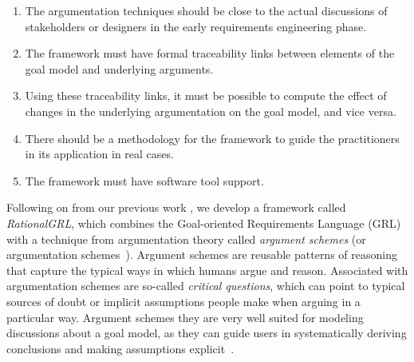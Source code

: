 \begin{enumerate}
\item 
The argumentation techniques should be close to the actual discussions of stakeholders or designers in the early requirements engineering phase.
\item 
The framework must have formal traceability links between elements of the goal model and underlying arguments.
\item 
Using these traceability links, it must be possible to compute the effect of changes in the underlying argumentation on the goal model, and vice versa.
\item 
There should be a methodology for the framework to guide the practitioners in its application in real cases.
\item 
The framework must have software tool support.
\end{enumerate}




Following on from our previous work \cite{vanzee-etal:renext2015,vanZee-etal:er2016}, we develop a framework called \emph{RationalGRL}, which combines the Goal-oriented Requirements Language (GRL) \cite{Amyot:2010:EGM:1841349.1841356} with a technique from argumentation theory called \emph{argument schemes} (or argumentation schemes~\cite{walton-etal2008}). Argument schemes are reusable patterns of reasoning that capture the typical ways in which humans argue and reason. Associated with argumentation schemes are so-called \emph{critical questions}, which can point to typical sources of doubt or implicit assumptions people make when arguing in a particular way. Argument schemes they are very well suited for modeling discussions about a goal model, as they can guide users in systematically deriving conclusions and making assumptions explicit~\cite{murukannaiah2015}. 

